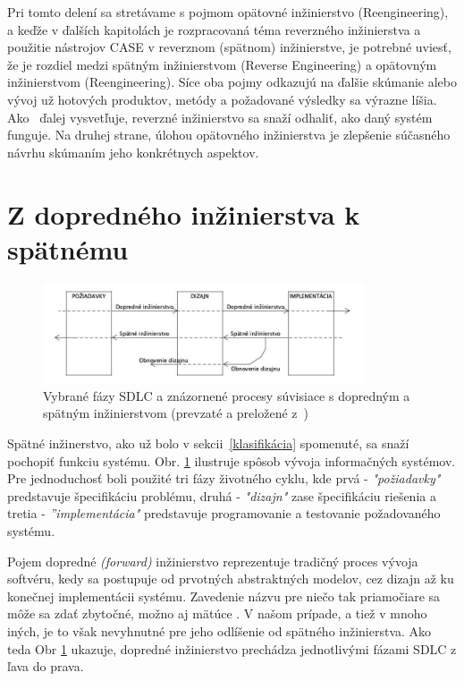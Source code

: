 \documentclass[10pt,twoside,slovak,a4paper]{article}
\begin{document}
Pri tomto delení sa stretávame s pojmom opätovné inžinierstvo (Reengineering), a keďže v ďalších kapitolách je rozpracovaná téma reverzného inžinierstva a použitie nástrojov CASE v reverznom (spätnom) inžinierstve, je potrebné uviesť, že je rozdiel medzi spätným inžinierstvom (Reverse Engineering) a opätovným inžinierstvom (Reengineering). Síce oba pojmy odkazujú na ďalšie skúmanie alebo vývoj už hotových produktov, metódy a požadované výsledky sa výrazne líšia.  Ako~\cite{reengineering} ďalej vysvetľuje, reverzné inžinierstvo sa snaží odhaliť, ako daný systém funguje. Na druhej strane, úlohou opätovného inžinierstva je zlepšenie súčasného návrhu skúmaním jeho konkrétnych aspektov. 


\section{Z dopredného inžinierstva k spätnému}\label{forward vs reverse}
\begin{figure}[tbh]
\centering
\includegraphics[width=0.85\textwidth]{forward_reverse.jpg}
\caption{Vybrané fázy SDLC a znázornené procesy súvisiace s dopredným a spätným inžinierstvom (prevzaté a preložené z~\cite{2010})}
\label{obr_forward_reverse}
\end{figure}

Spätné inžinerstvo, ako už bolo v sekcii~\ref{klasifikácia} spomenuté, sa snaží pochopiť funkciu systému. Obr. \ref{obr_forward_reverse} ilustruje spôsob vývoja informačných systémov. Pre jednoduchosť boli použité tri fázy životného cyklu, kde prvá -  \emph{"požiadavky"} predstavuje špecifikáciu problému, druhá  - \emph{"dizajn"} zase špecifikáciu riešenia a tretia -  \emph{''implementácia"} predstavuje programovanie a testovanie požadovaného systému.

Pojem dopredné \textit{(forward)} inžinierstvo reprezentuje tradičný proces vývoja softvéru, kedy sa postupuje od prvotných abstraktných modelov, cez dizajn až ku konečnej implementácii systému. Zavedenie názvu pre niečo tak priamočiare sa môže sa zdať zbytočné, možno aj mätúce . V našom prípade, a tiež v mnoho iných, je to však nevyhnutné pre jeho odlíšenie od spätného inžinierstva. Ako teda Obr \ref{obr_forward_reverse} ukazuje, dopredné inžinierstvo prechádza jednotlivými fázami SDLC z ľava do prava.
\end{document}
